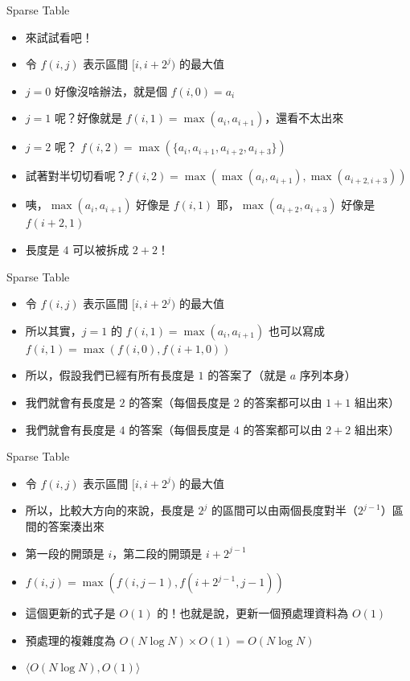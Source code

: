 \documentclass[standalone]{beamer}
\begin{document}
\begin{frame}[fragile]{Sparse Table}
  \begin{itemize}
    \item 來試試看吧！
    \item 令 \(f(i, j)\) 表示區間 \([i, i+2^j)\) 的最大值
    \item $j = 0$ 好像沒啥辦法，就是個 $f(i, 0) = a_i$
    \item $j = 1$ 呢？好像就是 $f(i, 1) = \max(a_i, a_{i + 1})$，還看不太出來
    \item $j = 2$ 呢？ $f(i, 2) = \max(\{a_i, a_{i + 1}, a_{i + 2}, a_{i + 3}\})$
    \item 試著對半切切看呢？$f(i, 2) = \max(\max(a_i, a_{i + 1}), \max(a_{i + 2, i + 3}))$
    \item 咦，$\max(a_i, a_{i + 1})$ 好像是 $f(i, 1)$ 耶，$\max(a_{i + 2}, a_{i + 3})$ 好像是 $f(i + 2, 1)$
    \item 長度是 $4$ 可以被拆成 $2 + 2$！
  \end{itemize}
\end{frame}

\begin{frame}[fragile]{Sparse Table}
  \begin{itemize}
    \item 令 \(f(i, j)\) 表示區間 \([i, i+2^j)\) 的最大值
    \item 所以其實，$j = 1$ 的 $f(i, 1) = \max(a_i, a_{i + 1})$ 也可以寫成 $f(i, 1) = \max(f(i, 0), f(i + 1, 0))$
    \item 所以，假設我們已經有所有長度是 $1$ 的答案了（就是 $a$ 序列本身）
    \item 我們就會有長度是 $2$ 的答案（每個長度是 $2$ 的答案都可以由 $1 + 1$ 組出來）
    \item 我們就會有長度是 $4$ 的答案（每個長度是 $4$ 的答案都可以由 $2 + 2$ 組出來）
  \end{itemize}
\end{frame}

\begin{frame}{Sparse Table}
  \begin{itemize}
    \item 令 \(f(i, j)\) 表示區間 \([i, i+2^j)\) 的最大值
    \item 所以，比較大方向的來說，長度是 $2^j$ 的區間可以由兩個長度對半（$2^{j - 1}$）區間的答案湊出來
    \item 第一段的開頭是 $i$，第二段的開頭是 $i + 2^{j - 1}$
    \item $f(i, j) = \max(f(i, j - 1), f(i + 2^{j - 1}, j - 1))$
    \item 這個更新的式子是 $O(1)$ 的！也就是說，更新一個預處理資料為 $O(1)$
    \item 預處理的複雜度為 $O(N \log N) \times O(1) = O(N \log N)$
    \item \(\langle {O}(N \log N), {O}(1)\rangle\)
  \end{itemize}
\end{frame}
\end{document}
